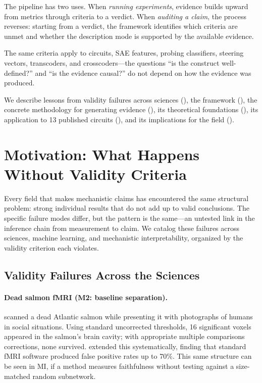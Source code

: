 \documentclass{article}
\begin{document}
The pipeline has two uses. When \emph{running experiments}, evidence builds upward from metrics through criteria to a verdict. When \emph{auditing a claim}, the process reverses: starting from a verdict, the framework identifies which criteria are unmet and whether the description mode is supported by the available evidence.

The same criteria apply to circuits, SAE features, probing classifiers, steering vectors, transcoders, and crosscoders---the questions ``is the construct well-defined?'' and ``is the evidence causal?'' do not depend on how the evidence was produced.

We describe lessons from validity failures across sciences (), the framework (), the concrete methodology for generating evidence (), its theoretical foundations (), its application to 13 published circuits (), and its implications for the field ().


\section{Motivation: What Happens Without Validity Criteria}
\label{sec:motivation}

Every field that makes mechanistic claims has encountered the same structural problem: strong individual results that do not add up to valid conclusions. The specific failure modes differ, but the pattern is the same---an untested link in the inference chain from measurement to claim. We catalog these failures across sciences, machine learning, and mechanistic interpretability, organized by the validity criterion each violates.

\subsection{Validity Failures Across the Sciences}

\paragraph{Dead salmon fMRI (M2: baseline separation).}
\citet{bennett2010neural} scanned a dead Atlantic salmon while presenting it with photographs of humans in social situations. Using standard uncorrected thresholds, 16 significant voxels appeared in the salmon's brain cavity; with appropriate multiple comparisons corrections, none survived. \citet{eklund2016cluster} extended this systematically, finding that standard fMRI software produced false positive rates up to 70\%. This same structure can be seen in MI, if a method measures faithfulness without testing against a size-matched random subnetwork.
\end{document}
